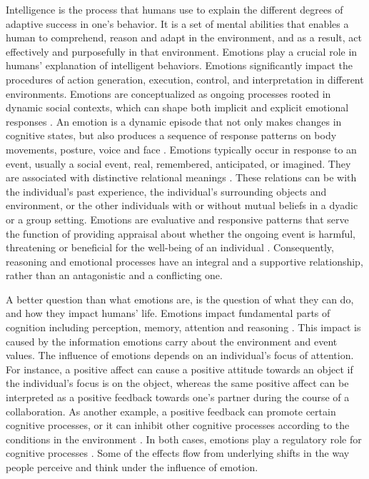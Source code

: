 \documentclass[12pt]{report}
\begin{document}
Intelligence is the process that humans use to explain the different degrees of
adaptive success in one's behavior. It is a set of mental abilities that enables
a human to comprehend, reason and adapt in the environment, and as a result, act
effectively and purposefully in that environment. Emotions play a crucial role
in humans' explanation of intelligent behaviors. Emotions significantly impact
the procedures of action generation, execution, control, and interpretation
\cite{zhu:emotion-action} in different environments. Emotions are conceptualized
as ongoing processes rooted in dynamic social contexts, which can shape both
implicit and explicit emotional responses
\cite{parkinson:emotion-social-interaction}. An emotion is a dynamic episode
that not only makes changes in cognitive states, but also produces a sequence of
response patterns on body movements, posture, voice and face
\cite{scherer:expression-appraisal}. Emotions typically occur in response to an
event, usually a social event, real, remembered, anticipated, or imagined. They
are associated with distinctive relational meanings
\cite{parkinson:holds-emotion}. These relations can be with the individual's
past experience, the individual's surrounding objects and environment, or the
other individuals with or without mutual beliefs in a dyadic or a group setting.
Emotions are evaluative and responsive patterns that serve the function of
providing appraisal about whether the ongoing event is harmful, threatening or
beneficial for the well-being of an individual \cite{zhu:emotion-action}.
Consequently, reasoning and emotional processes have an integral and a
supportive relationship, rather than an antagonistic and a conflicting one.

A better question than what emotions are, is the question of what they can
do, and how they impact humans' life. Emotions impact fundamental parts of
cognition including perception, memory, attention and reasoning
\cite{clore:judgement-regulation}. This impact is caused by the information
emotions carry about the environment and event values. The influence of emotions
depends on an individual's focus of attention. For instance, a positive affect
can cause a positive attitude towards an object if the individual's focus is on
the object, whereas the same positive affect can be interpreted as a positive
feedback towards one's partner during the course of a collaboration. As another
example, a positive feedback can promote certain cognitive processes, or it can
inhibit other cognitive processes according to the conditions in the environment
\cite{clore:affective-guidance}. In both cases, emotions play a regulatory role
for cognitive processes \cite{gross:emotion-generation-regulation}. Some of the
effects flow from underlying shifts in the way people perceive and think under
the influence of emotion.
\end{document}
